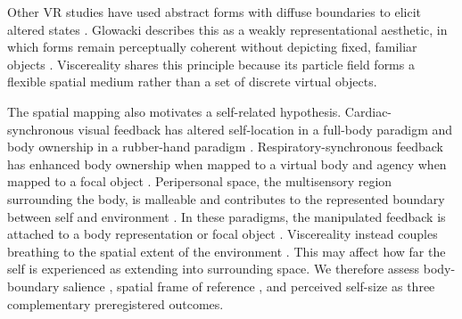 \documentclass[pdflatex,sn-basic,lineno]{sn-jnl}
\begin{document}
Other VR studies have used abstract forms with diffuse boundaries to elicit altered states \citep{Glowacki2020, Glowacki2022, vidal2025inducing}. Glowacki describes this as a weakly representational aesthetic, in which forms remain perceptually coherent without depicting fixed, familiar objects \citep{Glowacki2024}. Viscereality shares this principle because its particle field forms a flexible spatial medium rather than a set of discrete virtual objects.

The spatial mapping also motivates a self-related hypothesis. Cardiac-synchronous visual feedback has altered self-location in a full-body paradigm \citep{Aspell2013} and body ownership in a rubber-hand paradigm \citep{Suzuki2013}. Respiratory-synchronous feedback has enhanced body ownership when mapped to a virtual body \citep{MontiEtAl2020} and agency when mapped to a focal object \citep{Wald2023}. Peripersonal space, the multisensory region surrounding the body, is malleable and contributes to the represented boundary between self and environment \citep{Bufacchi2018, Serino2019}. In these paradigms, the manipulated feedback is attached to a body representation or focal object \citep{Aspell2013, Suzuki2013, MontiEtAl2020, Wald2023}. Viscereality instead couples breathing to the spatial extent of the environment \citep{fejer2025viscereality, fejer2026breathing}. This may affect how far the self is experienced as extending into surrounding space. We therefore assess body-boundary salience \citep{Dambrun2016}, spatial frame of reference \citep{Hanley2019}, and perceived self-size \citep{vidal2025inducing} as three complementary preregistered outcomes.
\end{document}
